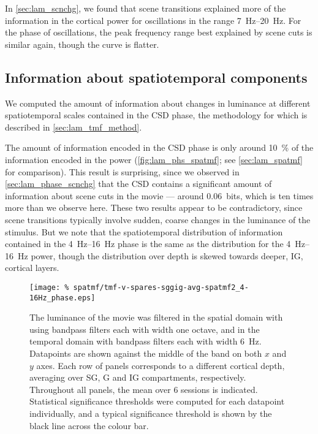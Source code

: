 In \autoref{sec:lam_scnchg}, we found that scene transitions explained more of the information in the cortical power for oscillations in the range \SIrange{7}{20}{Hz}.
For the phase of oscillations, the peak frequency range best explained by scene cuts is similar again, though the curve is flatter.


\subsection{Information about spatiotemporal components}

We computed the amount of information about changes in luminance at different spatiotemporal scales contained in the \ac{CSD} phase, the methodology for which is described in \autoref{sec:lam_tmf_method}.

The amount of information encoded in the \ac{CSD} phase is only around \SI{10}{\percent} of the information encoded in the power (\autoref{fig:lam_phs_spatmf}; see \autoref{sec:lam_spatmf} for comparison).
This result is surprising, since we observed in \autoref{sec:lam_phase_scnchg} that the \ac{CSD} contains a significant amount of information about scene cuts in the movie --- around \SI{0.06}{bits}, which is ten times more than we observe here.
These two results appear to be contradictory, since scene transitions typically involve sudden, coarse changes in the luminance of the stimulus.
But we note that the spatiotemporal distribution of information contained in the \SIrange{4}{16}{Hz} phase is the same as the distribution for the \SIrange{4}{16}{Hz} power, though the distribution over depth is skewed towards deeper, \ac{IG}, cortical layers.


\begin{figure}[htbp]
\centering
    \texttt{[image: \%
spatmf/tmf-v-spares-sggig-avg-spatmf2\_4-16Hz\_phase.eps]}
\caption{%
The luminance of the movie was filtered in the spatial domain with using bandpass filters each with width one octave, and in the temporal domain with bandpass filters each with width \SI{6}{Hz}.
Datapoints are shown against the middle of the band on both $x$ and $y$ axes.
Each row of panels corresponds to a different cortical depth, averaging over \ac{SG}, \ac{G} and \ac{IG} compartments, respectively.
Throughout all panels, the mean over \num{6} sessions is indicated.
Statistical significance thresholds were computed for each datapoint individually, and a typical significance threshold is shown by the black line across the colour bar.
}%
\label{fig:lam_phs_spatmf}
%
\end{figure}


